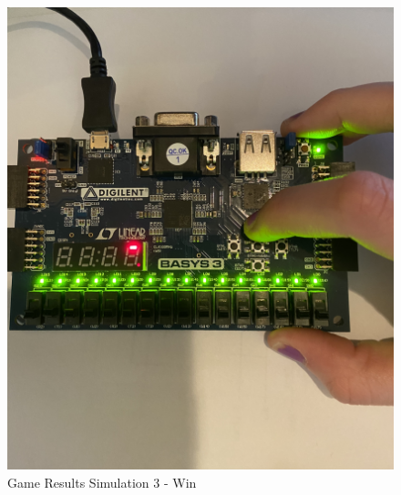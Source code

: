 \documentclass[11pt]{article}
\begin{document}
\begin{figure}[ht]\centering
	\includegraphics[angle=0, width=1.0\textwidth]{IMG_7265.jpg}
	\caption{Game Results Simulation 3 - Win}
	\label{fig:sim_with_table}
\end{figure}
\clearpage
\end{document}
